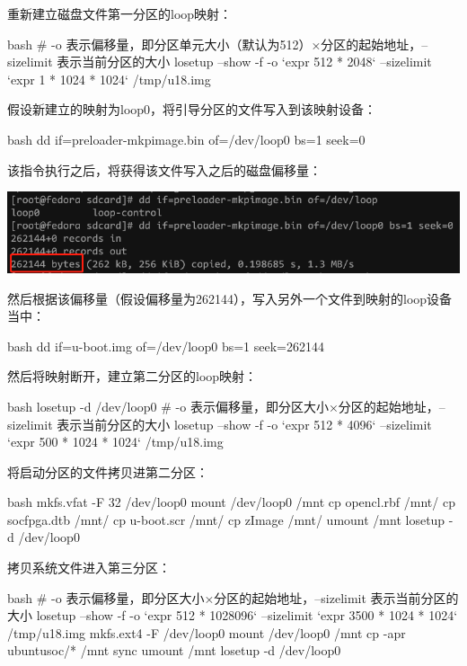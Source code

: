 \begin{outline}[enumerate]
重新建立磁盘文件第一分区的loop映射：
\begin{code-block}{bash}
# -o 表示偏移量，即分区单元大小（默认为512）×分区的起始地址，--sizelimit 表示当前分区的大小
losetup  --show -f -o `expr 512 * 2048` --sizelimit `expr 1 * 1024 * 1024` /tmp/u18.img
\end{code-block}

假设新建立的映射为loop0，将引导分区的文件写入到该映射设备：
\begin{code-block}{bash}
dd if=preloader-mkpimage.bin of=/dev/loop0 bs=1 seek=0
\end{code-block}
该指令执行之后，将获得该文件写入之后的磁盘偏移量：
\par\begin{minipage}{\linewidth}
  \centering
  \includegraphics[width=\linewidth]{loop_offset.png}
  \label{fig:loop_offset}
\end{minipage}
然后根据该偏移量（假设偏移量为262144），写入另外一个文件到映射的loop设备当中：
\begin{code-block}{bash}
dd if=u-boot.img of=/dev/loop0 bs=1 seek=262144
\end{code-block}

然后将映射断开，建立第二分区的loop映射：
\begin{code-block}{bash}
losetup -d /dev/loop0
# -o 表示偏移量，即分区大小×分区的起始地址，--sizelimit 表示当前分区的大小
losetup  --show -f -o `expr 512 * 4096` --sizelimit `expr 500 * 1024 * 1024` /tmp/u18.img
\end{code-block}

将启动分区的文件拷贝进第二分区：
\begin{code-block}{bash}
mkfs.vfat -F 32 /dev/loop0
mount /dev/loop0 /mnt
cp opencl.rbf  /mnt/
cp socfpga.dtb /mnt/
cp u-boot.scr /mnt/
cp zImage /mnt/
umount /mnt
losetup -d /dev/loop0
\end{code-block}

拷贝系统文件进入第三分区：
\begin{code-block}{bash}
# -o 表示偏移量，即分区大小×分区的起始地址，--sizelimit 表示当前分区的大小
losetup  --show -f -o `expr 512 * 1028096` --sizelimit `expr 3500 * 1024 * 1024` /tmp/u18.img
mkfs.ext4 -F /dev/loop0
mount /dev/loop0 /mnt
cp -apr ubuntusoc/* /mnt
sync
umount /mnt
losetup -d /dev/loop0
\end{code-block}


\end{outline}

